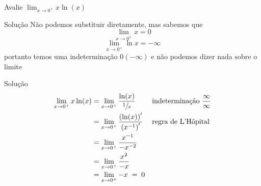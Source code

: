 \begin{question}
  Avalie
  \(
    \lim_{x \to 0^+} x\ln(x)
  \)
\end{question}

\begin{resolution}{Solução}
  Não podemos substituir diretamente, mas sabemos que
  \[
    \lim_{x \to 0^+} x = 0
  \]
  \[
    \lim_{x \to 0^+} \ln x = -\infty
  \]
  portanto temos uma indeterminação \(0(-\infty)\)
  e não podemos dizer nada sobre o limite
\end{resolution}

\begin{resolution}{Solução}
  \begin{align*}
    \lim_{x \to 0^+} x\ln(x)
    & = \lim_{x \to 0^+} \frac{\ln(x)}{\sfrac{1}{x}}  & & \text{indeterminação } \frac{\infty}{\infty}\\
    & = \lim_{x \to 0^+} \frac{\left(\ln(x)\right)'}{\left(x^{-1}\right)'} & & \text{regra de L'Hôpital} \\
    & = \lim_{x \to 0^+} \frac{x^{-1}}{-x^{-2}} \\
    & = \lim_{x \to 0^+} \frac{x^2}{-x} \\
    & = \lim_{x \to 0^+} -x \;=\; 0
  \end{align*}
\end{resolution}

